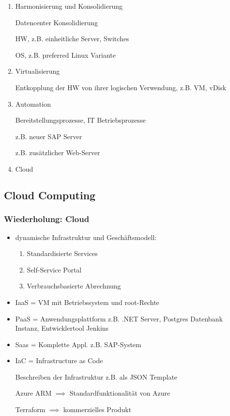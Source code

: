 \documentclass[a4paper]{article}
\begin{document}
\begin{enumerate}
    \item Harmonisierung und Konsolidierung
    
    Datencenter Konsolidierung

    HW, z.B. einheitliche Server, Switches

    OS, z.B. preferred Linux Variante
    \item Virtualisierung
    
    Entkopplung der HW von ihrer logischen Verwendung, z.B. VM, vDisk
    \item Automation
    
    Bereitstellungsprozesse, IT Betriebsprozesse

    z.B. neuer SAP Server

    z.B. zusätzlicher Web-Server
    \item Cloud
\end{enumerate}

\subsection{Cloud Computing}


\subsubsection{Wiederholung: Cloud}

\begin{itemize}
    \item dynamische Infrastruktur und Geschäftsmodell:
    \begin{enumerate}
        \item Standardisierte Services
        \item Self-Service Portal
        \item Verbrauchsbasierte Abrechnung
    \end{enumerate}
    \item IaaS = VM mit Betriebssystem und root-Rechte
    \item PaaS = Anwendungsplattform z.B. .NET Server, Postgres Datenbank Instanz, Entwicklertool Jenkins
    \item Saas = Komplette Appl. z.B. SAP-System
    \item IaC = Infrastructure as Code
    
    Beschreiben der Infrastruktur z.B. als JSON Template

    Azure ARM $\implies$ Standardfunktionalität von Azure

    Terraform $\implies$ kommerzielles Produkt
\end{itemize}
\end{document}
